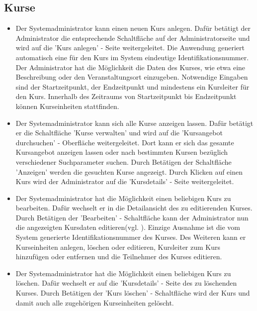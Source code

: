 \documentclass[a4paper]{scrreprt}
\begin{document}
		\subsection{Kurse}
			\begin{itemize}
				\item {}
					Der Systemadministrator kann einen neuen Kurs anlegen. Dafür betätigt der Administrator die entsprechende Schaltfläche auf der Administratorseite und wird auf die 'Kurs anlegen' - Seite weitergeleitet. Die Anwendung generiert automatisch eine für den Kurs im System eindeutige Identifikationsnummer. Der Administrator hat die Möglichkeit die Daten des Kurses, wie etwa eine Beschreibung oder den Veranstaltungsort einzugeben. Notwendige Eingaben sind der Startzeitpunkt, der Endzeitpunkt und mindestens ein Kursleiter für den Kurs. Innerhalb des Zeitraums von Startzeitpunkt bis Endzeitpunkt können Kurseinheiten stattfinden.
				\item {}
					Der Systemadministrator kann sich alle Kurse anzeigen lassen. Dafür betätigt er die Schaltfläche 'Kurse verwalten' und wird auf die 'Kursangebot durchsuchen' - Oberfläche weitergeleitet. Dort kann er sich das gesamte Kursangebot anzeigen lassen oder nach bestimmten Kursen bezüglich verschiedener Suchparameter suchen. Durch Betätigen der Schaltfläche 'Anzeigen' werden die gesuchten Kurse angezeigt. Durch Klicken auf einen Kurs wird der Administrator auf die 'Kursdetails' - Seite weitergeleitet.
				\item {}
					Der Systemadministrator hat die Möglichkeit einen beliebigen Kurs zu bearbeiten. Dafür wechselt er in die Detailansicht des zu editierenden Kurses. Durch Betätigen der 'Bearbeiten' - Schaltfläche  kann der Administrator nun die angezeigten Kursdaten editieren(vgl. ). Einzige Ausnahme ist die vom System generierte Identifikationsnummer des Kurses. Des Weiteren kann er Kurseinheiten anlegen, löschen oder editieren, Kursleiter zum Kurs hinzufügen oder entfernen und die Teilnehmer des Kurses editieren.
				\item {}
					Der Systemadministrator hat die Möglichkeit einen beliebigen Kurs zu löschen. Dafür wechselt er auf die 'Kursdetails' - Seite des zu löschenden Kurses. Durch Betätigen der 'Kurs löschen' - Schaltfläche wird der Kurs und damit auch alle zugehörigen Kurseinheiten gelöscht.
			\end{itemize}
\end{document}
